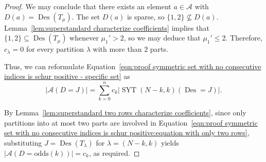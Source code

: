 \documentclass[11pt]{article}
\theoremstyle{definition}
\numberwithin{equation}{section}
\newcommand{\Des}{\operatorname{Des}}
\newcommand{\Syt}{\operatorname{SYT}}
\newcommand{\A}{\mathcal{A}}
\newcommand{\odds}{\mathrm{odds}}
\begin{document}
\begin{proof}
    We may conclude that there exists an element $a \in \A$ with $D(a) = \Des(T_\mu)$. The set $D(a)$ is sparse, so $\{1,2\} \nsubseteq D(a)$. Lemma~\ref{lem:superstandard characterize coefficients} implies that $\{1,2\} \subseteq \Des(T_\mu)$ whenever $\mu_1' >2$, so we may deduce that $\mu_1' \le 2$. Therefore, $c_\lambda = 0$ for every partition $\lambda$ with more than $2$ parts.
    
    Thus, we can reformulate Equation~\eqref{eqn:proof symmetric set with no consecutive indices is schur positive - specific set} as
    \begin{equation}\label{eqn:proof symmetric set with no consecutive indices is schur positive:equation with only two rows}
        |\A(D = J)| = \sum_{k=0}^n c_k \left|\Syt(N-k,k)(\Des = J)\right|.
    \end{equation}
    
    By Lemma~\ref{lem:superstandard two rows characterize coefficients}, since only partitions into at most two parts are involved in Equation~\eqref{eqn:proof symmetric set with no consecutive indices is schur positive:equation with only two rows}, substituting $J = \Des(T_{\lambda})$ for $\lambda = (N-k,k)$ yields $|\A(D = \odds(k))| = c_k$, as required.
\end{proof}
\end{document}
